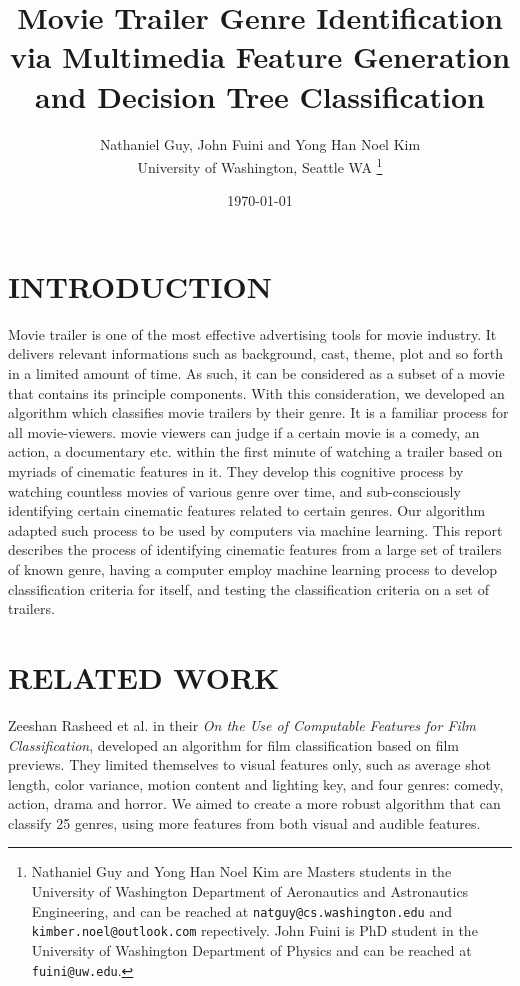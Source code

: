 \documentclass[letterpaper, 10 pt, conference]{ieeeconf}  %
\title{\LARGE \bf
Movie Trailer Genre Identification via Multimedia Feature Generation and Decision Tree Classification\\
}
\author{Nathaniel Guy, John Fuini and Yong Han Noel Kim\\
	University of Washington, Seattle WA%
\thanks{Nathaniel Guy and Yong Han Noel Kim are Masters students in the University of Washington Department of Aeronautics and Astronautics Engineering, and can be reached at {\tt\small natguy@cs.washington.edu} and {\tt\small kimber.noel@outlook.com} repectively. John Fuini is PhD student in the University of Washington Department of Physics and can be reached at {\tt\small fuini@uw.edu}. }%
}
\date{ \today}
\begin{document}
\maketitle
\thispagestyle{empty}
\pagestyle{empty}

\begin{abstract}



\end{abstract}

\section{INTRODUCTION}
Movie trailer is one of the most effective advertising tools for movie industry. It delivers relevant informations such as background, cast, theme, plot and so forth in a limited amount of time. As such, it can be considered as a subset of a movie that contains its principle components. With this consideration, we developed an algorithm which classifies movie trailers by their genre. It is a familiar process for all movie-viewers. movie viewers can judge if a certain movie is a comedy, an action, a documentary etc. within the first minute of watching a trailer based on myriads of cinematic features in it. They develop this cognitive process by watching countless movies of various genre over time, and sub-consciously identifying certain cinematic features related to certain genres. Our algorithm adapted such process to be used by computers via machine learning. This report describes the process of identifying cinematic features from a large set of trailers of known genre, having a computer employ machine learning process to develop classification criteria for itself, and testing the classification criteria on a set of trailers. 



\section{RELATED WORK}
Zeeshan Rasheed et al. in their \textit{On the Use of Computable Features for Film Classification}\cite{Rasheed}, developed an algorithm for film classification based on film previews. They limited themselves to visual features only, such as average shot length, color variance, motion content and lighting key, and four genres: comedy, action, drama and horror. We aimed to create a more robust algorithm that can classify 25 genres, using more features from both visual and audible features.
\end{document}
